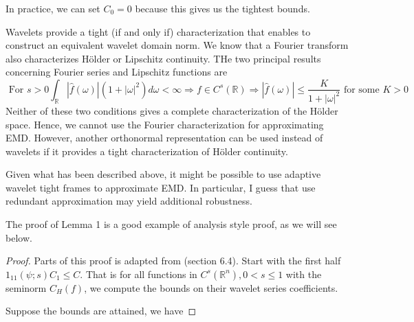 \documentclass[12pt, reqno]{amsart}
\begin{document}
In practice, we can set $C_0=0$ because this gives us the tightest bounds.

Wavelets provide a tight (if and only if) characterization that enables to construct an equivalent wavelet domain norm. We know that a Fourier transform also characterizes H\"{o}lder or Lipschitz continuity. THe two principal results concerning Fourier series and Lipschitz functions are 
\begin{equation}
	\textrm{ For } s>0 \int_\mathbb{R} |\hat{f}(\omega)|(1+|\omega|^2)d\omega < \infty \Longrightarrow f\in C^{s}(\mathbb{R}) \Longrightarrow |\hat{f}(\omega)| \leq \frac{K}{1+|\omega|^2} \textrm{ for some } K > 0
\end{equation}
Neither of these two conditions gives a complete characterization of the H\"{o}lder space. Hence, we cannot use the Fourier characterization for approximating EMD. However, another orthonormal representation can be used instead of wavelets if it provides a tight characterization of H\"{o}lder continuity. 

{\color{red} Given what has been described above, it might be possible to use adaptive wavelet tight frames to approximate EMD. In particular, I guess that use redundant approximation may yield additional robustness.}

The proof of Lemma 1 is a good example of analysis style proof, as we will see below.



\begin{proof}
Parts of this proof is adapted from \cite{meyer1992wavelets}(section 6.4). Start with  the first half $1_11(\psi;s)C_1 \leq C$. That is for all functions in $C^{s}(\mathbb{R}^n), 0 < s \leq 1$ with the seminorm $C_H(f)$, we compute the bounds on their wavelet series coefficients.

Suppose the bounds are attained, we have
\end{proof}


















{}

\end{document}
